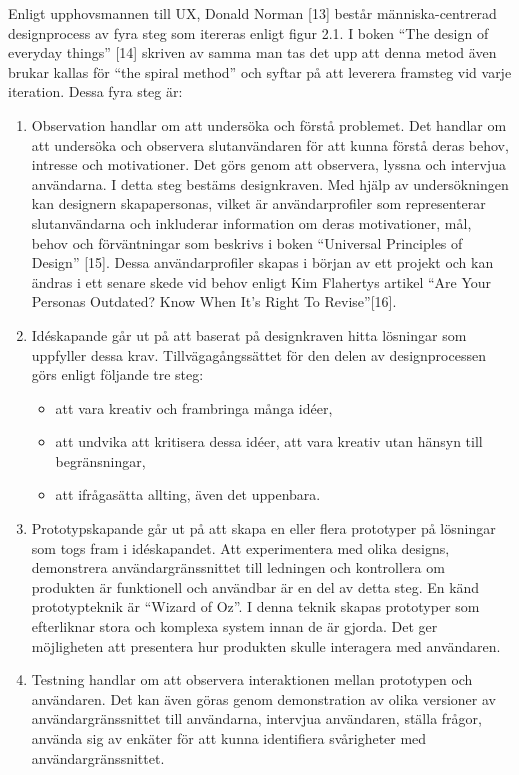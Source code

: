 \documentclass[12pt]{kththesis}
\begin{document}
Enligt upphovsmannen till UX, Donald Norman [13] består människa-centrerad designprocess av fyra steg som itereras enligt figur 2.1. I boken “The design of everyday things” [14] skriven av samma man tas det upp att denna metod även brukar kallas för “the spiral method” och syftar på att leverera framsteg vid varje iteration. Dessa fyra steg är:  

\begin{enumerate}
\item Observation handlar om att undersöka och förstå problemet. Det handlar om att undersöka och observera slutanvändaren för att kunna förstå deras behov, intresse och motivationer. Det görs genom att observera, lyssna och intervjua användarna. I detta steg bestäms designkraven. Med hjälp av undersökningen kan designern skapapersonas, vilket är användarprofiler som representerar slutanvändarna och inkluderar information om deras motivationer, mål, behov och förväntningar som beskrivs i boken “Universal Principles of Design” [15]. Dessa användarprofiler skapas i början av ett projekt och kan ändras i ett senare skede vid behov enligt Kim Flahertys artikel “Are Your Personas Outdated? Know When It’s Right To Revise”[16].

\item Idéskapande går ut på att baserat på designkraven hitta lösningar som uppfyller dessa krav. Tillvägagångssättet för den delen av designprocessen görs enligt följande tre steg:
\begin{itemize}
\item att vara kreativ och frambringa många idéer,
\item att undvika att kritisera dessa idéer, att vara kreativ utan hänsyn till begränsningar,
\item att ifrågasätta allting, även det uppenbara. 
\end{itemize}

\item Prototypskapande går ut på att skapa en eller flera prototyper på lösningar som togs fram i idéskapandet. Att experimentera med olika designs, demonstrera användargränssnittet till ledningen och kontrollera om produkten är funktionell och användbar är en del av detta steg. En känd prototypteknik är “Wizard of Oz”. I denna teknik skapas prototyper som efterliknar stora och komplexa system innan de är gjorda. Det ger möjligheten att presentera hur produkten skulle interagera med användaren. 

\item Testning handlar om att observera interaktionen mellan prototypen och användaren. Det kan även göras genom demonstration av olika versioner av användargränssnittet till användarna, intervjua användaren, ställa frågor, använda sig av enkäter för att kunna identifiera svårigheter med användargränssnittet. 
 
\end{enumerate}
\end{document}
